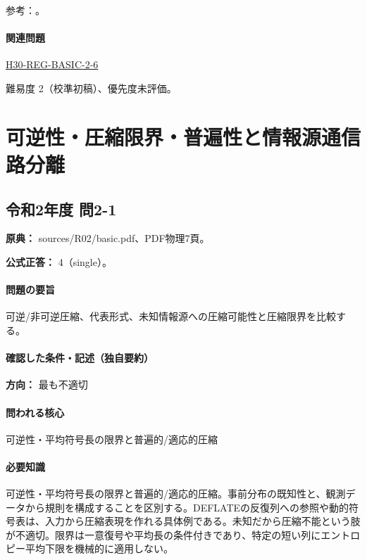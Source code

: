 \par 参考：\cite{mit_discrete2015}。

\paragraph{関連問題} \hyperref[q:h30-reg-basic-2-6]{H30-REG-BASIC-2-6}

\par 難易度 2（校準初稿）、優先度未評価。

\section{可逆性・圧縮限界・普遍性と情報源通信路分離}

\subsection{令和2年度 問2-1}
\label{q:r02-reg-basic-2-1}

\noindent\textbf{原典：} sources/R02/basic.pdf、PDF物理7頁。

\textbf{公式正答：} 4（single）。

\paragraph{問題の要旨} 可逆/非可逆圧縮、代表形式、未知情報源への圧縮可能性と圧縮限界を比較する。

\paragraph{確認した条件・記述（独自要約）}\mbox{}\par

\noindent\textbf{方向：} 最も不適切\par

\paragraph{問われる核心} 可逆性・平均符号長の限界と普遍的/適応的圧縮

\paragraph{必要知識} 可逆性・平均符号長の限界と普遍的/適応的圧縮。事前分布の既知性と、観測データから規則を構成することを区別する。DEFLATEの反復列への参照や動的符号表は、入力から圧縮表現を作れる具体例である。未知だから圧縮不能という肢が不適切。限界は一意復号や平均長の条件付きであり、特定の短い列にエントロピー平均下限を機械的に適用しない。

